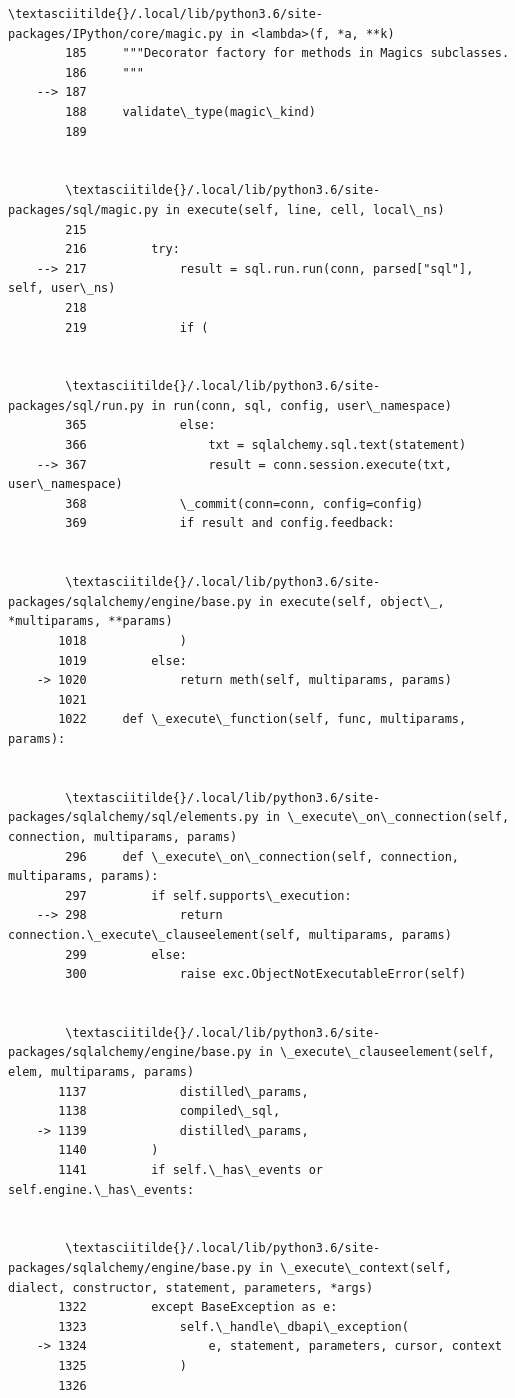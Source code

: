 \documentclass[11pt]{article}
\begin{document}
\begin{Verbatim}[commandchars=\\\{\}]
        \textasciitilde{}/.local/lib/python3.6/site-packages/IPython/core/magic.py in <lambda>(f, *a, **k)
        185     """Decorator factory for methods in Magics subclasses.
        186     """
    --> 187 
        188     validate\_type(magic\_kind)
        189 


        \textasciitilde{}/.local/lib/python3.6/site-packages/sql/magic.py in execute(self, line, cell, local\_ns)
        215 
        216         try:
    --> 217             result = sql.run.run(conn, parsed["sql"], self, user\_ns)
        218 
        219             if (


        \textasciitilde{}/.local/lib/python3.6/site-packages/sql/run.py in run(conn, sql, config, user\_namespace)
        365             else:
        366                 txt = sqlalchemy.sql.text(statement)
    --> 367                 result = conn.session.execute(txt, user\_namespace)
        368             \_commit(conn=conn, config=config)
        369             if result and config.feedback:


        \textasciitilde{}/.local/lib/python3.6/site-packages/sqlalchemy/engine/base.py in execute(self, object\_, *multiparams, **params)
       1018             )
       1019         else:
    -> 1020             return meth(self, multiparams, params)
       1021 
       1022     def \_execute\_function(self, func, multiparams, params):


        \textasciitilde{}/.local/lib/python3.6/site-packages/sqlalchemy/sql/elements.py in \_execute\_on\_connection(self, connection, multiparams, params)
        296     def \_execute\_on\_connection(self, connection, multiparams, params):
        297         if self.supports\_execution:
    --> 298             return connection.\_execute\_clauseelement(self, multiparams, params)
        299         else:
        300             raise exc.ObjectNotExecutableError(self)


        \textasciitilde{}/.local/lib/python3.6/site-packages/sqlalchemy/engine/base.py in \_execute\_clauseelement(self, elem, multiparams, params)
       1137             distilled\_params,
       1138             compiled\_sql,
    -> 1139             distilled\_params,
       1140         )
       1141         if self.\_has\_events or self.engine.\_has\_events:


        \textasciitilde{}/.local/lib/python3.6/site-packages/sqlalchemy/engine/base.py in \_execute\_context(self, dialect, constructor, statement, parameters, *args)
       1322         except BaseException as e:
       1323             self.\_handle\_dbapi\_exception(
    -> 1324                 e, statement, parameters, cursor, context
       1325             )
       1326 



\end{Verbatim}
\end{document}
